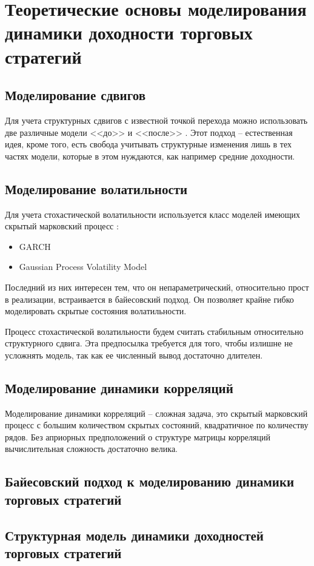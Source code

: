 \chapter{Теоретические основы моделирования динамики доходности торговых стратегий}
\section{Моделирование сдвигов}
Для учета структурных сдвигов с известной точкой перехода можно использовать две различные модели <<до>> и <<после>> \citep{salazar1982}. Этот подход -- естественная идея, кроме того, есть свобода учитывать структурные изменения лишь в тех частях модели, которые в этом нуждаются, как например средние доходности.

\section{Моделирование волатильности}
Для учета стохастической волатильности используется класс моделей имеющих скрытый марковский процесс \citep{ghahramani2001}:
\begin{itemize}
	\item GARCH \citep{engle1982}
	\item Gaussian Process Volatility Model \citep{han2016}
\end{itemize}
Последний из них интересен тем, что он непараметрический, относительно прост в реализации, встраивается в байесовский подход. Он позволяет крайне гибко моделировать скрытые состояния волатильности.

Процесс стохастической волатильности будем считать стабильным относительно структурного сдвига. Эта предпосылка требуется для того, чтобы излишне не усложнять модель, так как ее численный вывод достаточно длителен.
\section{Моделирование динамики корреляций}
Моделирование динамики корреляций -- сложная задача, это скрытый марковский процесс с большим количеством скрытых состояний, квадратичное по количеству рядов. Без априорных предположений о структуре матрицы корреляций вычислительная сложность достаточно велика.


\section{Байесовский подход к моделированию динамики торговых стратегий}
\section{Структурная модель динамики доходностей торговых стратегий}
